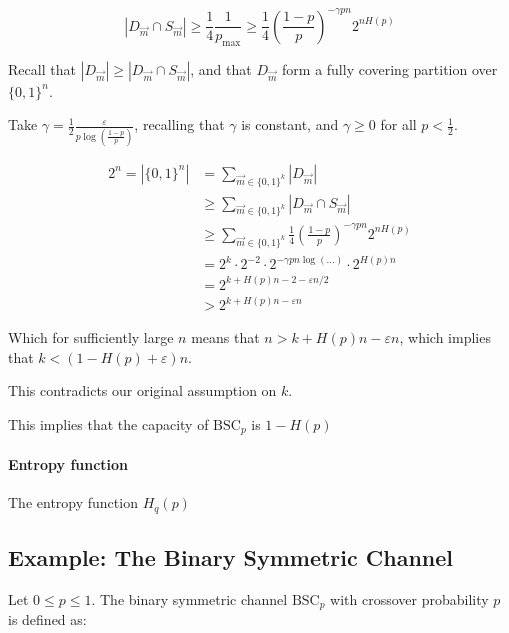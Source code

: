 \documentclass{idc_msc}
\begin{document}
\begin{enumerate}
\begin{itemize}
    \[|D_{\vec{m}} \cap S_{\vec{m}}| \ge \frac{1}{4}\frac{1}{p_{\max}} \ge \frac{1}{4} \left(\frac{1-p}{p}\right)^{-\gamma pn} 2^{nH(p)}\]

    Recall that \(|D_{\vec{m}}| \ge |D_{\vec{m}} \cap S_{\vec{m}}|\), and that \(D_{\vec{m}}\) form a fully covering partition over \(\{0,1\}^n\).

    Take \(\gamma = \frac{1}{2} \frac{\varepsilon}{p \log\left(\frac{1-p}{p}\right)}\), recalling that \(\gamma\) is constant, and \(\gamma \ge 0\) for all \(p < \frac{1}{2}\).

    \[
    \begin{aligned}
    2^n = |\{0,1\}^n|
    &= \sum_{\vec{m} \in \{0,1\}^k} |D_{\vec{m}}| \\
    &\ge \sum_{\vec{m} \in \{0,1\}^k} |D_{\vec{m}} \cap S_{\vec{m}}| \\
    &\ge \sum_{\vec{m} \in \{0,1\}^k} \frac{1}{4} \left(\frac{1-p}{p}\right)^{-\gamma pn} 2^{nH(p)} \\
    &= 2^k\cdot 2^{-2} \cdot 2^{-\gamma pn \log(\ldots)} \cdot 2^{H(p)n} \\
    &= 2^{k+H(p)n -2 - \varepsilon n/2} \\
    &> 2^{k+H(p)n - \varepsilon n}
    \end{aligned}
    \]

    Which for sufficiently large \(n\) means that \(n > k + H(p)n - \varepsilon n\), which implies that \(k < (1 - H(p) + \varepsilon) n\).

    This contradicts our original assumption on \(k\).
  \end{itemize}
\end{enumerate}

This implies that the capacity of \(\text{BSC}_p\) is \(1 - H(p)\)

\paragraph{Entropy function}

The entropy function \(H_q(p)\)

\subsection{Example: The Binary Symmetric Channel}

Let \(0 \le p \le 1\). The binary symmetric channel \(\text{BSC}_p\) with crossover probability \(p\) is defined as:

\end{document}
